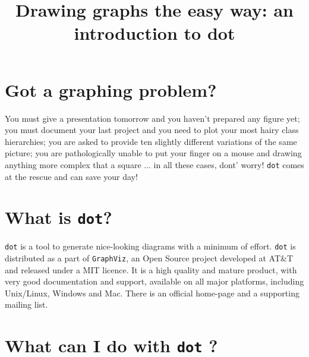 \documentclass[10pt,english]{article}
\title{Drawing graphs the easy way: an introduction to dot}
\author{}
\date{}
\newlength{\locallinewidth}
\begin{document}
\maketitle


\setlength{\locallinewidth}{\linewidth}



\hypertarget{got-a-graphing-problem}{}
\section*{Got a graphing problem?}

You must give a presentation tomorrow and you haven't prepared any
figure yet; you must document your last project and you need to plot
your most hairy class hierarchies;  you are asked to provide ten slightly 
different variations of the same picture; you are pathologically unable to put 
your finger on a mouse and drawing anything more complex that a square ...
in all these cases,  dont' worry! \texttt{dot} comes at the rescue and 
can save your day!



\hypertarget{what-is-dot}{}
\section*{What is \texttt{dot}?}

\texttt{dot} is a tool to generate nice-looking diagrams with a minimum of
effort. \texttt{dot} is distributed as a part of \texttt{GraphViz}, an
Open Source project developed at AT{\&}T and released under a MIT licence.
It is a high quality and mature product, with very good 
documentation and support, available on all major platforms, 
including Unix/Linux, Windows and Mac. There is an official home-page and 
a supporting mailing list.



\hypertarget{what-can-i-do-with-dot}{}
\section*{What can I do with \texttt{dot} ?}
\end{document}
